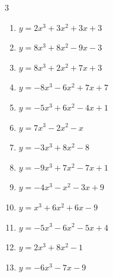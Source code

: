 \begin{multicols}{3}
\begin{enumerate}
  \item $y=2x^{3}+3x^{2}+3x+3$


  \item $y=8x^{3}+8x^{2}-9x-3$


  \item $y=8x^{3}+2x^{2}+7x+3$


\columnbreak %

  \item $y=-8x^{3}-6x^{2}+7x+7$


  \item $y=-5x^{3}+6x^{2}-4x+1$


  \item $y=7x^{3}-2x^{2}-x$


  \item $y=-3x^{3}+8x^{2}-8$


  \item $y=-9x^{3}+7x^{2}-7x+1$


  \item $y=-4x^{3}-x^{2}-3x+9$


  \item $y=x^{3}+6x^{2}+6x-9$


  \item $y=-5x^{3}-6x^{2}-5x+4$


  \item $y=2x^{3}+8x^{2}-1$


  \item $y=-6x^{3}-7x-9$


\end{enumerate}
\end{multicols}
